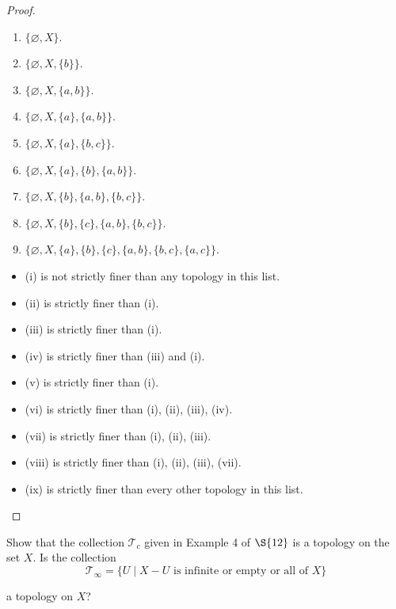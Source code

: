 \begin{proof}
    \begin{enumerate}[label={(\roman*)}]
        \item $\{ \varnothing, X \}$.
        \item $\{ \varnothing, X, \{ b \} \}$.
        \item $\{ \varnothing, X, \{ a, b \} \}$.
        \item $\{ \varnothing, X, \{ a \}, \{ a, b \} \}$.
        \item $\{ \varnothing, X, \{ a \}, \{ b, c \} \}$.
        \item $\{ \varnothing, X, \{ a \}, \{ b \}, \{ a, b \} \}$.
        \item $\{ \varnothing, X, \{ b \}, \{ a, b \}, \{ b, c \} \}$.
        \item $\{ \varnothing, X, \{ b \}, \{ c \}, \{ a, b \}, \{ b, c \} \}$.
        \item $\{ \varnothing, X, \{ a \}, \{ b \}, \{ c \}, \{ a, b \}, \{ b, c \}, \{ a, c \} \}$.
    \end{enumerate}

    \begin{itemize}
        \item (i) is not strictly finer than any topology in this list.
        \item (ii) is strictly finer than (i).
        \item (iii) is strictly finer than (i).
        \item (iv) is strictly finer than (iii) and (i).
        \item (v) is strictly finer than (i).
        \item (vi) is strictly finer than (i), (ii), (iii), (iv).
        \item (vii) is strictly finer than (i), (ii), (iii).
        \item (viii) is strictly finer than (i), (ii), (iii), (vii).
        \item (ix) is strictly finer than every other topology in this list.
    \end{itemize}
\end{proof}

\begin{exercise}\label{chapter2:section13:exercise3}
    Show that the collection $\mathscr{T}_{c}$ given in Example 4 of $\S{12}$ is a topology on the set $X$. Is the collection
    \[
        \mathscr{T}_{\infty} = \{ U \mid \text{$X - U$ is infinite or empty or all of $X$} \}
    \]

    a topology on $X$?
\end{exercise}

